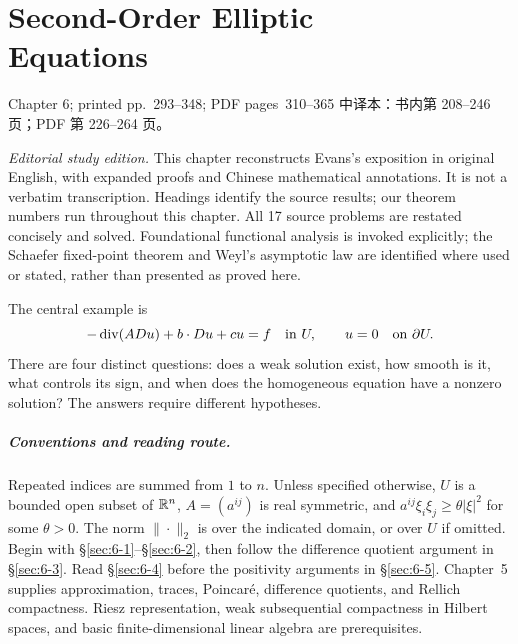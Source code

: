 \chapter[Second-Order Elliptic Equations]{Second-Order Elliptic\\Equations}
\label{chap:second-order-elliptic-equations}
\PDESource
  {Chapter 6; printed pp.~293--348; PDF pages~310--365}
  {中译本：书内第 208--246 页；PDF 第 226--264 页。}

\noindent\textit{Editorial study edition.}
This chapter reconstructs Evans's exposition in original English, with
expanded proofs and Chinese mathematical annotations. It is not a verbatim
transcription. Headings identify the source results; our theorem numbers
run throughout this chapter. All 17 source problems are restated concisely
and solved. Foundational functional analysis is invoked explicitly;
the Schaefer fixed-point theorem and Weyl's asymptotic law are identified
where used or stated, rather than presented as proved here.

\Needspace{45mm}
The central example is
\[
 -\operatorname{div}(A Du)+b\cdot Du+cu=f\quad\hbox{in }U,
 \qquad u=0\quad\hbox{on }\partial U.
\]
There are four distinct questions: does a weak solution exist, how smooth
is it, what controls its sign, and when does the homogeneous equation
have a nonzero solution? The answers require different hypotheses.

\paragraph{Conventions and reading route.}
Repeated indices are summed from $1$ to $n$. Unless specified otherwise,
$U$ is a bounded open subset of $\mathbb{R}^n$, $A=(a^{ij})$ is real symmetric,
and $a^{ij}\xi_i\xi_j\geq\theta|\xi|^2$ for some $\theta>0$.
The norm $\|\cdot\|_2$ is over the indicated domain, or over $U$ if omitted.
Begin with \S\ref{sec:6-1}--\S\ref{sec:6-2}, then follow the difference
quotient argument in \S\ref{sec:6-3}. Read \S\ref{sec:6-4} before the
positivity arguments in \S\ref{sec:6-5}. Chapter~5 supplies approximation,
traces, Poincar\'e, difference quotients, and Rellich compactness.
Riesz representation, weak subsequential compactness in Hilbert spaces,
and basic finite-dimensional linear algebra are prerequisites.

\clearpage






